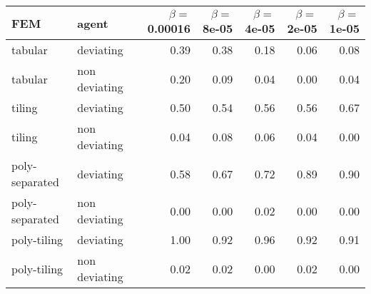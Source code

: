 \begin{tabular}{llrrrrr}
  \hline
FEM & agent & $\beta =$ 0.00016 & $\beta =$ 8e-05 & $\beta =$ 4e-05 & $\beta =$ 2e-05 & $\beta =$ 1e-05 \\ 
  \hline
tabular & deviating & 0.39 & 0.38 & 0.18 & 0.06 & 0.08 \\ 
  tabular & non deviating & 0.20 & 0.09 & 0.04 & 0.00 & 0.04 \\ 
  tiling & deviating & 0.50 & 0.54 & 0.56 & 0.56 & 0.67 \\ 
  tiling & non deviating & 0.04 & 0.08 & 0.06 & 0.04 & 0.00 \\ 
  poly-separated & deviating & 0.58 & 0.67 & 0.72 & 0.89 & 0.90 \\ 
  poly-separated & non deviating & 0.00 & 0.00 & 0.02 & 0.00 & 0.00 \\ 
  poly-tiling & deviating & 1.00 & 0.92 & 0.96 & 0.92 & 0.91 \\ 
  poly-tiling & non deviating & 0.02 & 0.02 & 0.00 & 0.02 & 0.00 \\ 
   \hline
\end{tabular}
